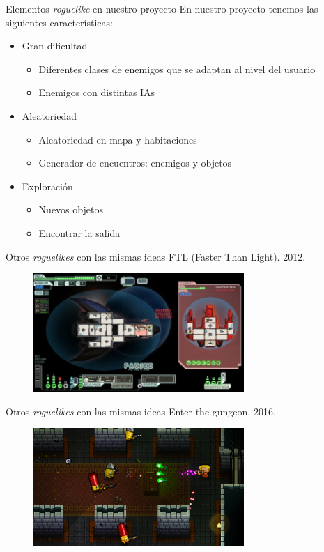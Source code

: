 \begin{tframe}{Elementos \textit{roguelike} en nuestro proyecto}
	En nuestro proyecto tenemos las siguientes características:
	\begin{itemize}
		\item Gran dificultad
			\begin{itemize}
				\item Diferentes clases de enemigos que se adaptan al nivel del usuario
				\item Enemigos con distintas IAs
			\end{itemize}
		\item Aleatoriedad
		\begin{itemize}
			\item Aleatoriedad en mapa y habitaciones
			\item Generador de encuentros: enemigos y objetos
		\end{itemize}
		\item<+-| alert@+> Exploración
		\begin{itemize}
			\item Nuevos objetos
			\item Encontrar la salida
		\end{itemize}
	\end{itemize}
\end{tframe}


\begin{tframe}{Otros \textit{roguelikes} con las mismas ideas}
	FTL (Faster Than Light). 2012.
	\begin{figure}[h]
		\includegraphics[width=8cm]{../img/ftl}
	\end{figure}
\end{tframe}

\begin{tframe}{Otros \textit{roguelikes} con las mismas ideas}
	Enter the gungeon. 2016.
	\begin{figure}[h]
		\includegraphics[width=8cm]{../img/enterthegungeon}
	\end{figure}
\end{tframe}

